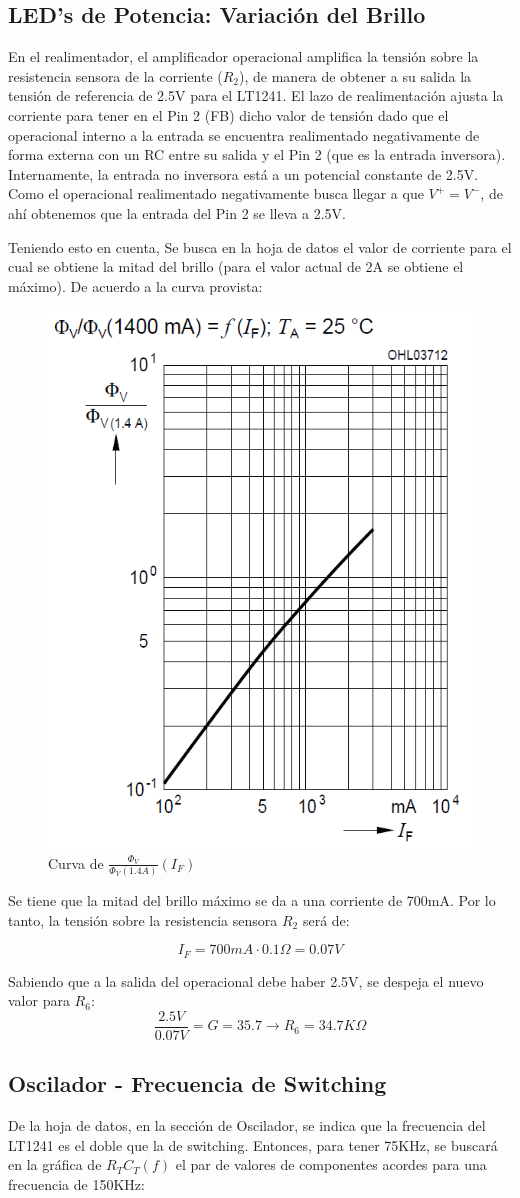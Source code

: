 \documentclass[e4_tp2_main.tex]{subfiles}
\begin{document}
\subsection{LED's de Potencia: Variación del Brillo}
En el realimentador, el amplificador operacional amplifica la tensión sobre la resistencia sensora de la corriente ($R_2$), de manera de obtener a su salida la tensión de referencia de 2.5V para el LT1241. El lazo de realimentación ajusta la corriente para tener en el Pin 2 (FB) dicho valor de tensión dado que el operacional interno a la entrada se encuentra realimentado negativamente de forma externa con un RC entre su salida y el Pin 2 (que es la entrada inversora). Internamente, la entrada no inversora está a un potencial constante de 2.5V. Como el operacional realimentado negativamente busca llegar a que $V^+ = V^-$, de ahí obtenemos que la entrada del Pin 2 se lleva a 2.5V.\par
Teniendo esto en cuenta, Se busca en la hoja de datos el valor de corriente para el cual se obtiene la mitad del brillo (para el valor actual de 2A se obtiene el máximo). De acuerdo a la curva provista:

\begin{figure}[H]
\centering
\includegraphics[width=0.27\linewidth]{Imagenes/Punto2/Lumen-IF.png}
\caption{Curva de $\frac{\Phi_V}{\Phi_V(1.4A)}(I_F)$}
\end{figure}

Se tiene que la mitad del brillo máximo se da a una corriente 
de 700mA. Por lo tanto, la tensión sobre la resistencia sensora $R_2$ será de: 

\[
I_F = 700mA \cdot 0.1\Omega = 0.07V
\]

Sabiendo que a la salida del operacional debe haber 2.5V, se despeja el nuevo valor para $R_6$:
\[
\frac{2.5V}{0.07V} = G = 35.7 \longrightarrow R_6 = 34.7K \Omega
\]

\subsection{Oscilador - Frecuencia de Switching}
De la hoja de datos, en la sección de Oscilador, se indica que la frecuencia del LT1241 es el doble que la de switching. Entonces, para tener 75KHz, se buscará en la gráfica de $R_TC_T(f)$ el par de valores de componentes acordes para una frecuencia de 150KHz:
\end{document}
